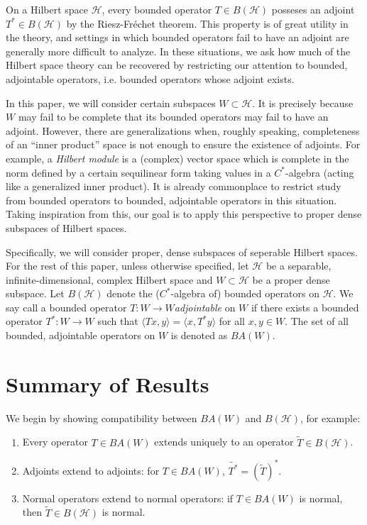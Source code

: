 \documentclass{dcthesis}
\numberwithin{equation}{section}
\numberwithin{equation}{section}
\theoremstyle{definition}
\begin{document}
On a Hilbert space $\mathcal{H}$, every bounded operator $T\in B(\mathcal{H})$ posseses an adjoint $T^\ast\in B(\mathcal{H})$ by the Riesz-Fr\'echet theorem. This property is of great utility in the theory, and settings in which bounded operators fail to have an adjoint are generally more difficult to analyze. In these situations, we ask how much of the Hilbert space theory can be recovered by restricting our attention to bounded, adjointable operators, i.e. bounded operators whose adjoint exists. 

In this paper, we will consider certain subspaces $W\subset\mathcal{H}$. It is precisely because $W$ may fail to be complete that its bounded operators may fail to have an adjoint. However, there are generalizations when, roughly speaking, completeness of an ``inner product'' space is not enough to ensure the existence of adjoints. For example, a \textit{Hilbert module} is a (complex) vector space which is complete in the norm defined by a certain sequilinear form taking values in a $C^\ast$-algebra (acting like a generalized inner product). It is already commonplace to restrict study from bounded operators to bounded, adjointable operators in this situation. Taking inspiration from this, our goal is to apply this perspective to proper dense subspaces of Hilbert spaces.

Specifically, we will consider proper, dense subspaces of seperable Hilbert spaces. For the rest of this paper, unless otherwise specified, let $\mathcal{H}$ be a separable, infinite-dimensional, complex Hilbert space and $W\subset\mathcal{H}$ be a proper dense subspace. Let $B(\mathcal{H})$ denote the ($C^\ast$-algebra of) bounded operators on $\mathcal{H}$. We say call a bounded operator $T:W\to W$\textit{adjointable} on $W$ if there exists a bounded operator $T^\ast: W\to W$ such that $\langle Tx, y\rangle = \langle x, T^\ast y\rangle$ for all $x,y\in W$. The set of all bounded, adjointable operators on $W$ is denoted as $BA(W)$.  


\section{Summary of Results} %

We begin by showing compatibility between $BA(W)$ and $B(\mathcal{H})$, for example:
\begin{enumerate}
	\item Every operator $T\in BA(W)$ extends uniquely to an operator $\tilde{T}\in B(\mathcal{H})$.
	\item Adjoints extend to adjoints: for $T\in BA(W)$, $\widetilde{T^\ast} = (\tilde{T})^\ast$.
	\item Normal operators extend to normal operators: if $T\in BA(W)$ is normal, then $\tilde{T}\in B(\mathcal{H})$ is normal.
\end{enumerate}
\end{document}
